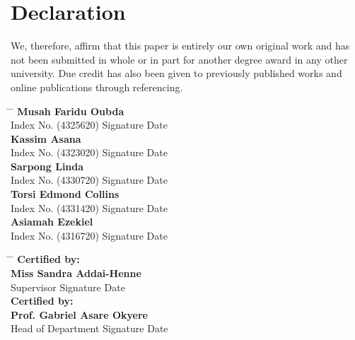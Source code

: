 \documentclass[doublespacing,12pt]{report}
\begin{document}

\chapter*{Declaration}



We, therefore, affirm that this paper is entirely our own original work and has not been submitted in whole or in part for another degree award in any other university. Due credit has also been given to previously published works and online publications through referencing. 
\vspace{0.1in}

\newpage
\begin{tabbing}
    \hspace{6cm} \= \hspace{4cm} \= \hspace{5cm} \kill
    \textbf{Musah Faridu Oubda} \> \makebox[4cm]{\dotfill} \> \makebox[4cm]{\dotfill} \\
    {Index No. (4325620)} \> {Signature} \> {Date} \\[1.5cm]
    \textbf{Kassim Asana} \> \makebox[3cm]{\dotfill} \> \makebox[3cm]{\dotfill} \\
    {Index No. (4323020)} \> {Signature} \> {Date} \\[1.5cm]
    \textbf{Sarpong Linda} \> \makebox[3cm]{\dotfill} \> \makebox[3cm]{\dotfill} \\
    {Index No. (4330720)} \> {Signature} \> {Date} \\[1.5cm]
    \textbf{Torsi Edmond Collins} \> \makebox[3cm]{\dotfill} \> \makebox[3cm]{\dotfill} \\
    {Index No. (4331420)} \> {Signature} \> {Date} \\[1.5cm]
    \textbf{Asiamah Ezekiel} \> \makebox[3cm]{\dotfill} \> \makebox[3cm]{\dotfill} \\
    {Index No. (4316720)} \> {Signature} \> {Date} \\[1.5cm]
\end{tabbing}

\begin{tabbing}
    \hspace{6cm} \= \hspace{4cm} \= \hspace{5cm} \kill
    \textbf{Certified by:}\\ 
    \textbf{Miss Sandra Addai-Henne} \> \makebox[3cm]{\dotfill} \> \makebox[3cm]{\dotfill} \\
    {Supervisor} \> {Signature} \> {Date} \\[1.5cm]
    \textbf{Certified by:}\\ 
    \textbf{Prof. Gabriel Asare Okyere} \> \makebox[3cm]{\dotfill} \> \makebox[3cm]{\dotfill} \\
    {Head of Department} \> {Signature} \> {Date}
\end{tabbing}
\end{document}
